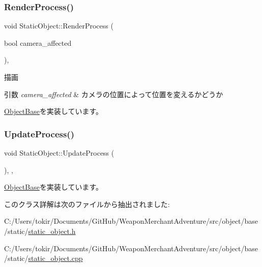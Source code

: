 \subsubsection{\texorpdfstring{Render\+Process()}{RenderProcess()}}
{\footnotesize\ttfamily void Static\+Object\+::\+Render\+Process (\begin{DoxyParamCaption}\item[{bool}]{camera\+\_\+affected }\end{DoxyParamCaption})\hspace{0.3cm}{\ttfamily [protected]}, {\ttfamily [virtual]}}



描画 


\begin{DoxyParams}{引数}
{\em camera\+\_\+affected} & カメラの位置によって位置を変えるかどうか \\
\hline
\end{DoxyParams}


\mbox{\hyperlink{class_object_base_aeac51d868beeb7f7fe900407b76b93a2}{Object\+Base}}を実装しています。

\mbox{\label{class_static_object_a0dd0ec514aa597a1dd83a1168902a079}} 
\subsubsection{\texorpdfstring{Update\+Process()}{UpdateProcess()}}
{\footnotesize\ttfamily void Static\+Object\+::\+Update\+Process (\begin{DoxyParamCaption}{ }\end{DoxyParamCaption})\hspace{0.3cm}{\ttfamily [inline]}, {\ttfamily [protected]}, {\ttfamily [virtual]}}



\mbox{\hyperlink{class_object_base_a8b5b72b363a419767efde0b0e692ea95}{Object\+Base}}を実装しています。



このクラス詳解は次のファイルから抽出されました\+:\begin{DoxyCompactItemize}
\item 
C\+:/\+Users/tokir/\+Documents/\+Git\+Hub/\+Weapon\+Merchant\+Adventure/src/object/base/static/\mbox{\hyperlink{static__object_8h}{static\+\_\+object.\+h}}\item 
C\+:/\+Users/tokir/\+Documents/\+Git\+Hub/\+Weapon\+Merchant\+Adventure/src/object/base/static/\mbox{\hyperlink{static__object_8cpp}{static\+\_\+object.\+cpp}}\end{DoxyCompactItemize}

